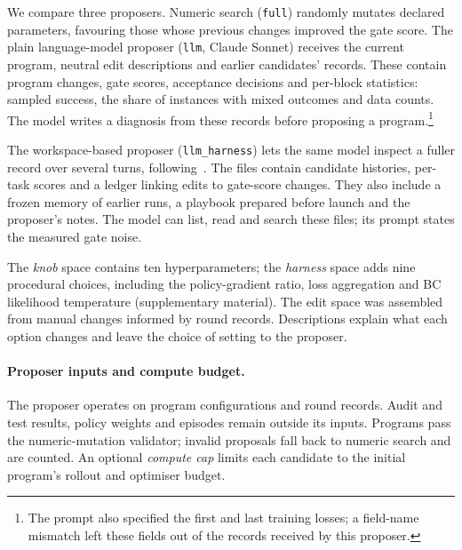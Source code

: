 We compare three proposers. Numeric search (\texttt{full}) randomly mutates declared parameters, favouring those whose previous changes improved the gate score. The plain language-model proposer (\texttt{llm}, Claude Sonnet) receives the current program, neutral edit descriptions and earlier candidates' records. These contain program changes, gate scores, acceptance decisions and per-block statistics: sampled success, the share of instances with mixed outcomes and data counts. The model writes a diagnosis from these records before proposing a program.\footnote{The prompt also specified the first and last training losses; a field-name mismatch left these fields out of the records received by this proposer.}

The workspace-based proposer (\texttt{llm\_harness}) lets the same model inspect a fuller record over several turns, following~\cite{lee2026metaharness,chen2026evotrainer}. The files contain candidate histories, per-task scores and a ledger linking edits to gate-score changes. They also include a frozen memory of earlier runs, a playbook prepared before launch and the proposer's notes. The model can list, read and search these files; its prompt states the measured gate noise.

The \emph{knob} space contains ten hyperparameters; the \emph{harness} space adds nine procedural choices, including the policy-gradient ratio, loss aggregation and BC likelihood temperature (supplementary material). The edit space was assembled from manual changes informed by round records. Descriptions explain what each option changes and leave the choice of setting to the proposer.

\paragraph{Proposer inputs and compute budget.} The proposer operates on program configurations and round records. Audit and test results, policy weights and episodes remain outside its inputs. Programs pass the numeric-mutation validator; invalid proposals fall back to numeric search and are counted. An optional \emph{compute cap} limits each candidate to the initial program's rollout and optimiser budget.
